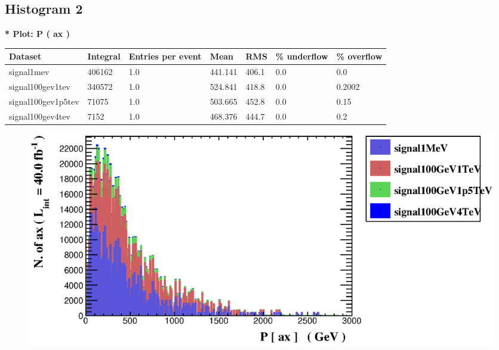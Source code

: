 \documentclass[a4paper, 10pt]{article}
\begin{document}
\subsection{ Histogram 2}

\textbf{* Plot: P ( ax ) }\\
   \begin{table}[H]
  \begin{center}
    \begin{tabular}{|m{23.0mm}|m{23.0mm}|m{18.0mm}|m{19.0mm}|m{19.0mm}|m{19.0mm}|m{19.0mm}|}
      \hline
      {\cellcolor{yellow}         Dataset}& {\cellcolor{yellow}         Integral}& {\cellcolor{yellow}         Entries per event}& {\cellcolor{yellow}         Mean}& {\cellcolor{yellow}         RMS}& {\cellcolor{yellow}         \% underflow}& {\cellcolor{yellow}         \% overflow}\\
      \hline
      {\cellcolor{white}         signal1mev}& {\cellcolor{white}         406162}& {\cellcolor{white}         1.0}& {\cellcolor{white}         441.141}& {\cellcolor{white}         406.1}& {\cellcolor{green}         0.0}& {\cellcolor{green}         0.0}\\
      \hline
      {\cellcolor{white}         signal100gev1tev}& {\cellcolor{white}         340572}& {\cellcolor{white}         1.0}& {\cellcolor{white}         524.841}& {\cellcolor{white}         418.8}& {\cellcolor{green}         0.0}& {\cellcolor{green}         0.2002}\\
      \hline
      {\cellcolor{white}         signal100gev1p5tev}& {\cellcolor{white}         71075}& {\cellcolor{white}         1.0}& {\cellcolor{white}         503.665}& {\cellcolor{white}         452.8}& {\cellcolor{green}         0.0}& {\cellcolor{green}         0.15}\\
      \hline
      {\cellcolor{white}         signal100gev4tev}& {\cellcolor{white}         7152}& {\cellcolor{white}         1.0}& {\cellcolor{white}         468.376}& {\cellcolor{white}         444.7}& {\cellcolor{green}         0.0}& {\cellcolor{green}         0.2}\\
\hline
    \end{tabular}
  \end{center}
\end{table}

\begin{figure}[H]
  \begin{center}
    \includegraphics[scale=0.45]{selection_1.eps}\\
\caption{   }
  \end{center}
\end{figure}
      
\end{document}
